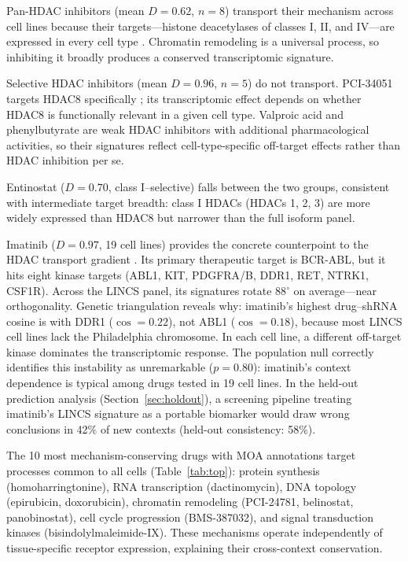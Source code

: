 \documentclass[11pt]{article}
\begin{document}
Pan-HDAC inhibitors (mean $D = 0.62$, $n = 8$) transport their mechanism
across cell lines because their targets---histone deacetylases of classes
I, II, and IV---are expressed in every cell type
\citep{bolden2006anticancer}. Chromatin remodeling is a universal process,
so inhibiting it broadly produces a conserved transcriptomic signature.

Selective HDAC inhibitors (mean $D = 0.96$, $n = 5$) do not transport.
PCI-34051 targets HDAC8 specifically
\citep{balasubramanian2008hdac8}; its transcriptomic effect depends on
whether HDAC8 is functionally relevant in a given cell type. Valproic acid
and phenylbutyrate are weak HDAC inhibitors with additional pharmacological
activities, so their signatures reflect cell-type-specific off-target
effects rather than HDAC inhibition per se.

Entinostat ($D = 0.70$, class I--selective) falls between the two groups,
consistent with intermediate target breadth: class I HDACs (HDACs 1, 2, 3)
are more widely expressed than HDAC8 but narrower than the full isoform
panel.

Imatinib ($D = 0.97$, 19 cell lines) provides the concrete counterpoint
to the HDAC transport gradient \citep{deininger2005imatinib}. Its primary
therapeutic target is BCR-ABL, but it hits eight kinase targets (ABL1,
KIT, PDGFRA/B, DDR1, RET, NTRK1, CSF1R). Across the LINCS panel, its
signatures rotate 88$^\circ$ on average---near orthogonality. Genetic
triangulation reveals why: imatinib's highest drug--shRNA cosine is with
DDR1 ($\cos = 0.22$), not ABL1 ($\cos = 0.18$), because most LINCS cell
lines lack the Philadelphia chromosome. In each cell line, a different
off-target kinase dominates the transcriptomic response. The population
null correctly identifies this instability as unremarkable ($p = 0.80$):
imatinib's context dependence is typical among drugs tested in 19 cell
lines. In the held-out prediction analysis (Section~\ref{sec:holdout}),
a screening pipeline treating imatinib's LINCS signature as a portable
biomarker would draw wrong conclusions in 42\% of new contexts
(held-out consistency: 58\%).

The 10 most mechanism-conserving drugs with MOA annotations target processes
common to all cells (Table~\ref{tab:top}): protein synthesis
(homoharringtonine), RNA transcription (dactinomycin), DNA topology
(epirubicin, doxorubicin), chromatin remodeling (PCI-24781, belinostat,
panobinostat), cell cycle progression (BMS-387032), and signal transduction
kinases (bisindolylmaleimide-IX). These mechanisms operate independently
of tissue-specific receptor expression, explaining their cross-context
conservation.
\end{document}
